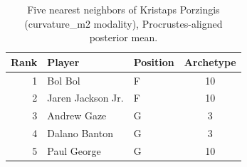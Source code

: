 \begin{table}[htbp]
  \centering\small
  \begin{tabular}{rllc}
    \toprule
    Rank & Player & Position & Archetype \\
    \midrule
    1 & Bol Bol & F & 10 \\
    2 & Jaren Jackson Jr. & F & 10 \\
    3 & Andrew Gaze & G & 3 \\
    4 & Dalano Banton & G & 3 \\
    5 & Paul George & G & 10 \\
    \bottomrule
  \end{tabular}
  \caption{Five nearest neighbors of Kristaps Porzingis (curvature_m2 modality), Procrustes-aligned posterior mean.}
  \label{tab:Kristaps_Porzingis_neighbors_curvature_m2}
\end{table}


